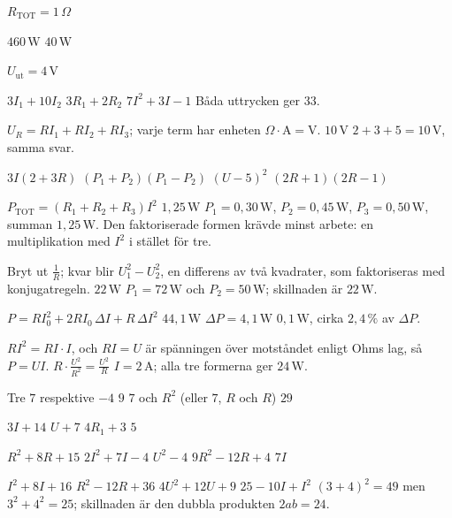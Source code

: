 
\begin{facit}

 $R_{\text{TOT}} = 1\,\Omega$

  $460\,\text{W}$  $40\,\text{W}$

 $U_{\text{ut}} = 4\,\text{V}$

  $3I_1 + 10I_2$  $3R_1 + 2R_2$  $7I^2 + 3I - 1$
 Båda uttrycken ger $33$.

  $U_R = RI_1 + RI_2 + RI_3$; varje term har enheten $\Omega \cdot \text{A} =
\text{V}$.  $10\,\text{V}$  $2 + 3 + 5 = 10\,\text{V}$, samma svar.

  $3I(2 + 3R)$  $(P_1 + P_2)(P_1 - P_2)$  $(U - 5)^2$
 $(2R + 1)(2R - 1)$

  $P_{\text{TOT}} = (R_1 + R_2 + R_3)I^2$  $1{,}25\,\text{W}$
 $P_1 = 0{,}30\,\text{W}$, $P_2 = 0{,}45\,\text{W}$, $P_3 = 0{,}50\,\text{W}$, summan
$1{,}25\,\text{W}$. Den faktoriserade formen krävde minst arbete: en multiplikation med $I^2$ i
stället för tre.

  Bryt ut $\frac{1}{R}$; kvar blir $U_1^2 - U_2^2$, en differens av två kvadrater,
som faktoriseras med konjugatregeln.  $22\,\text{W}$
 $P_1 = 72\,\text{W}$ och $P_2 = 50\,\text{W}$; skillnaden är $22\,\text{W}$.

  $P = RI_0^2 + 2RI_0\,\Delta I + R\,\Delta I^2$  $44{,}1\,\text{W}$
 $\Delta P = 4{,}1\,\text{W}$  $0{,}1\,\text{W}$, cirka $2{,}4\,\%$ av $\Delta P$.

  $RI^2 = RI \cdot I$, och $RI = U$ är spänningen över motståndet enligt Ohms lag,
så $P = UI$.  $R \cdot \frac{U^2}{R^2} = \frac{U^2}{R}$
 $I = 2\,\text{A}$; alla tre formerna ger $24\,\text{W}$.

  Tre  $7$ respektive $-4$  $9$
 $7$ och $R^2$ (eller $7$, $R$ och $R$)  $29$

  $3I + 14$  $U + 7$  $4R_1 + 3$  $5$

  $R^2 + 8R + 15$  $2I^2 + 7I - 4$  $U^2 - 4$
 $9R^2 - 12R + 4$  $7I$

  $I^2 + 8I + 16$  $R^2 - 12R + 36$  $4U^2 + 12U + 9$
 $25 - 10I + I^2$  $(3 + 4)^2 = 49$ men $3^2 + 4^2 = 25$; skillnaden är den dubbla
produkten $2ab = 24$.


\end{facit}
